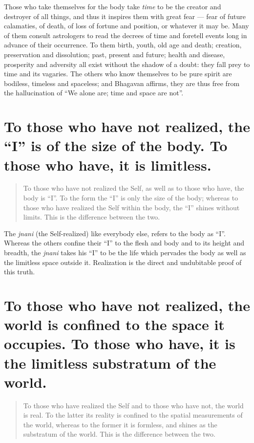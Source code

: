 \documentclass[12pt]{report}
\begin{document}
Those who take themselves for the body take \emph{time} to be the
creator and destroyer of all things, and thus it inspires them with
great fear --- fear of future calamaties, of death, of loss of fortune
and position, or whatever it may be. Many of them consult astrologers
to read the decrees of time and foretell events long in advance of
their occurrence. To them birth, youth, old age and death; creation,
preservation and dissolution; past, present and future; health and
disease, prosperity and adversity all exist without the shadow of a
doubt: they fall prey to time and its vagaries. The others who know
themselves to be pure spirit are bodiless, timeless and spaceless; and
Bhagavan affirms, they are thus free from the hallucination of ``We
alone are; time and space are not''.

\section{ To those who have not realized, the ``I'' is of the size
  of the body. To those who have, it is limitless.}

\begin{quote}
  To those who have not realized the Self, as well as to those who
  have, the body is ``I''. To the form the ``I'' is only the size of
  the body; whereas to those who have realized the Self within the
  body, the ``I'' shines without limits. This is the difference
  between the two.
\end{quote}


The \emph{jnani} (the Self-realized) like everybody else, refers to
the body as ``I''. Whereas the others confine their ``I'' to the flesh
and body and to its height and breadth, the \emph{jnani} takes his
``I'' to be the life which pervades the body as well as the limitless
space outside it. Realization is the direct and undubitable proof of
this truth. 

\section{ To those who have not realized, the world is confined to
  the space it occupies. To those who have, it is the limitless
  substratum of the world.}

\begin{quote}
  To those who have realized the Self and to those who have not, the
  world is real. To the latter its reality is confined to the spatial
  measurements of the world, whereas to the former it is formless, and
  shines as the substratum of the world. This is the difference
  between the two.
\end{quote}
\end{document}
